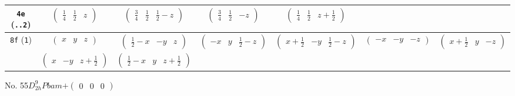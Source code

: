 \documentclass[fleqn,9pt,landscape]{jsarticle}
\begin{document}
\begin{center}
\begin{longtable}{ccccccc}
{\tt 4e} ({\tt ..2}) & $ \begin{pmatrix} \frac{1}{4} & \frac{1}{2} & z \end{pmatrix} $ & $ \begin{pmatrix} \frac{3}{4} & \frac{1}{2} & \frac{1}{2} - z \end{pmatrix} $ & $ \begin{pmatrix} \frac{3}{4} & \frac{1}{2} & - z \end{pmatrix} $ & $ \begin{pmatrix} \frac{1}{4} & \frac{1}{2} & z + \frac{1}{2} \end{pmatrix} $ & $  $ & $  $ \\ \hline
{\tt 8f} ({\tt 1}) & $ \begin{pmatrix} x & y & z \end{pmatrix} $ & $ \begin{pmatrix} \frac{1}{2} - x & - y & z \end{pmatrix} $ & $ \begin{pmatrix} - x & y & \frac{1}{2} - z \end{pmatrix} $ & $ \begin{pmatrix} x + \frac{1}{2} & - y & \frac{1}{2} - z \end{pmatrix} $ & $ \begin{pmatrix} - x & - y & - z \end{pmatrix} $ & $ \begin{pmatrix} x + \frac{1}{2} & y & - z \end{pmatrix} $ \\
& $ \begin{pmatrix} x & - y & z + \frac{1}{2} \end{pmatrix} $ & $ \begin{pmatrix} \frac{1}{2} - x & y & z + \frac{1}{2} \end{pmatrix} $ & $  $ & $  $ & $  $ & $  $ \\
\end{longtable}
\end{center}
\newpage
No. 55\quad$D_{2h}^{9}$\quad$Pbam$\quad[ orthorhombic ]\quad$+\begin{pmatrix} 0 & 0 & 0 \end{pmatrix}$
\end{document}
